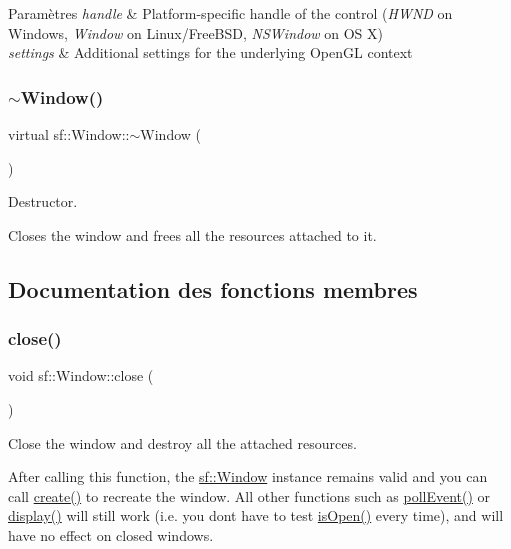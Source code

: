 \begin{DoxyParams}{Paramètres}
{\em handle} & Platform-\/specific handle of the control ({\itshape H\+W\+ND} on Windows, {\itshape Window} on Linux/\+Free\+B\+SD, {\itshape N\+S\+Window} on OS X) \\
\hline
{\em settings} & Additional settings for the underlying Open\+GL context \\
\hline
\end{DoxyParams}
\mbox{\label{classsf_1_1Window_ac30eb6ea5f5594204944d09d4bd69a97}} 
\subsubsection{\texorpdfstring{$\sim$\+Window()}{~Window()}}
{\footnotesize\ttfamily virtual sf\+::\+Window\+::$\sim$\+Window (\begin{DoxyParamCaption}{ }\end{DoxyParamCaption})\hspace{0.3cm}{\ttfamily [virtual]}}



Destructor. 

Closes the window and frees all the resources attached to it. 

\subsection{Documentation des fonctions membres}
\mbox{\label{classsf_1_1Window_a99d1e030387b0c26f5995670504fe7b5}} 
\subsubsection{\texorpdfstring{close()}{close()}}
{\footnotesize\ttfamily void sf\+::\+Window\+::close (\begin{DoxyParamCaption}{ }\end{DoxyParamCaption})}



Close the window and destroy all the attached resources. 

After calling this function, the \hyperlink{classsf_1_1Window}{sf\+::\+Window} instance remains valid and you can call \hyperlink{classsf_1_1Window_a30e6edf2162f8dbff61023b9de5d961d}{create()} to recreate the window. All other functions such as \hyperlink{classsf_1_1Window_a338e996585faf82e93069858e3b531b7}{poll\+Event()} or \hyperlink{classsf_1_1Window_adabf839cb103ac96cfc82f781638772a}{display()} will still work (i.\+e. you don\textquotesingle{}t have to test \hyperlink{classsf_1_1Window_ae873503db7d48157bb9cbf6129562bce}{is\+Open()} every time), and will have no effect on closed windows. \mbox{\label{classsf_1_1Window_a30e6edf2162f8dbff61023b9de5d961d}} 
